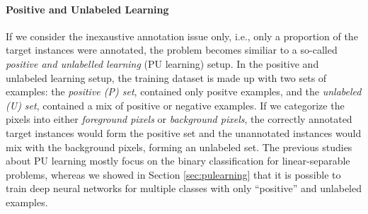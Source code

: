 \paragraph{Positive and Unlabeled Learning}
If we consider the inexaustive annotation issue only, i.e., only a proportion of the target instances were annotated, the problem becomes similiar to a so-called \textit{positive and unlabelled learning} (PU learning) setup\cite{li2005learning}.
In the positive and unlabeled learning setup, the training dataset is made up with two sets of examples: the \textit{positive (P) set}, contained only positve examples, and the \textit{unlabeled (U) set}, contained a mix of positive or negative examples.
If we categorize the pixels into either \textit{foreground pixels} or \textit{background pixels}, the correctly annotated target instances would form the positive set and the unannotated instances would mix with the background pixels, forming an unlabeled set.
The previous studies about PU learning mostly focus on the binary classification for linear-separable problems\cite{elkan2008learning,lee2003learning},  whereas we showed in Section \ref{sec:pulearning} that it is possible to train deep neural networks for multiple classes with only ``positive'' and unlabeled examples.
